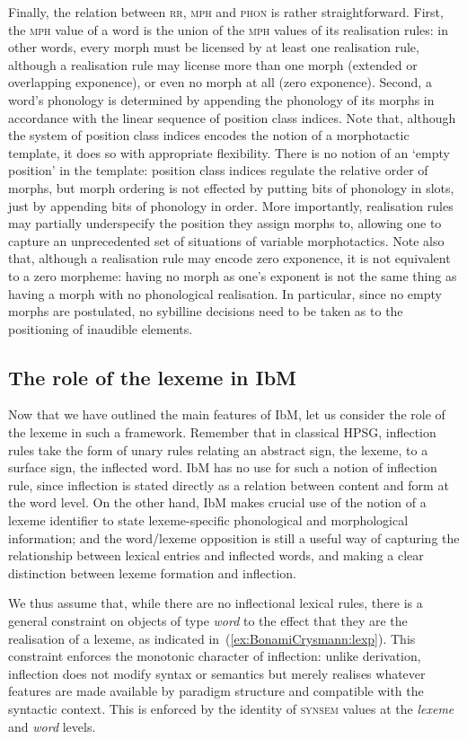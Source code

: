 \documentclass[output=paper]{langsci/langscibook}
\begin{document}
Finally, the relation between \textsc{rr}, \textsc{mph} and
\textsc{phon} is rather straightforward. First, the \textsc{mph} value
of a word is the union of the \textsc{mph} values of its realisation
rules: in other words, every morph must be licensed by at least one
realisation rule, although a realisation rule may license more than
one morph (extended or overlapping exponence), or even no morph at all
(zero exponence). Second, a word's phonology is determined by
appending the phonology of its morphs in accordance with the linear
sequence of position class indices. Note that, although the system of
position class indices encodes the notion of a morphotactic template,
it does so with appropriate flexibility. There is no notion of an
`empty position' in the template: position class indices regulate the
relative order of morphs, but morph ordering is not effected by
putting bits of phonology in slots, just by appending bits of
phonology in order. More importantly, realisation rules may partially
underspecify the position they assign morphs to, allowing one to
capture an unprecedented set of situations of variable
morphotactics. Note also that, although a realisation rule may encode
zero exponence, it is not equivalent to a zero morpheme: having no
morph as one's exponent is not the same thing as having a morph with
no phonological realisation. In particular, since no empty morphs are
postulated, no sybilline decisions need to be taken as to the
positioning of  inaudible elements.

\subsection{The role of the lexeme in IbM}

Now that we have outlined the main features of IbM, let us consider
the role of the lexeme in such a framework. Remember that in classical
HPSG, inflection rules take the form of unary rules relating an
abstract sign, the lexeme, to a surface sign, the inflected word. IbM
has no use for such a notion of inflection rule, since inflection is
stated directly as a relation between content and form at the word
level. On the other hand, IbM makes crucial use of the notion of a
lexeme identifier to state lexeme-specific phonological and
morphological information; and the word/lexeme opposition is still
a useful way of capturing the relationship between lexical entries
and inflected words, and making a clear distinction between lexeme
formation and inflection.

We thus assume that, while there are no inflectional lexical rules,
there is a general constraint on objects of type \emph{word} to the
effect that they are the realisation of a lexeme, as indicated in~(\ref{ex:BonamiCrysmann:lexp}).
This constraint enforces the monotonic character of inflection: unlike derivation, inflection does not modify syntax or semantics but merely realises whatever features are made available by paradigm structure and compatible with the syntactic context. This is enforced by the identity of \textsc{synsem} values at the \textit{lexeme} and \textit{word} levels.
\end{document}
